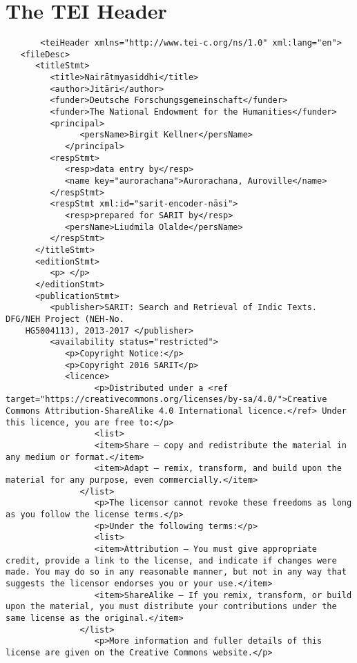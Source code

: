 \documentclass[article,12pt,a4paper]{memoir}%
\begin{document}
	 \chapter{The TEI Header}
	 \begin{verbatim}
       <teiHeader xmlns="http://www.tei-c.org/ns/1.0" xml:lang="en">
   <fileDesc>
      <titleStmt>
         <title>Nairātmyasiddhi</title>
         <author>Jitāri</author>
         <funder>Deutsche Forschungsgemeinschaft</funder>
         <funder>The National Endowment for the Humanities</funder>
         <principal>
	           <persName>Birgit Kellner</persName>
	        </principal>
         <respStmt>
            <resp>data entry by</resp>
            <name key="aurorachana">Aurorachana, Auroville</name>
         </respStmt>
         <respStmt xml:id="sarit-encoder-nāsi">
            <resp>prepared for SARIT by</resp>
            <persName>Liudmila Olalde</persName>
         </respStmt>
      </titleStmt>
      <editionStmt>
         <p> </p>
      </editionStmt>
      <publicationStmt>
         <publisher>SARIT: Search and Retrieval of Indic Texts. DFG/NEH Project (NEH-No.
	HG5004113), 2013-2017 </publisher>
         <availability status="restricted">
            <p>Copyright Notice:</p>
            <p>Copyright 2016 SARIT</p>
            <licence> 
	              <p>Distributed under a <ref target="https://creativecommons.org/licenses/by-sa/4.0/">Creative Commons Attribution-ShareAlike 4.0 International licence.</ref> Under this licence, you are free to:</p>
	              <list>
                  <item>Share — copy and redistribute the material in any medium or format.</item>
                  <item>Adapt — remix, transform, and build upon the material for any purpose, even commercially.</item>
               </list>
	              <p>The licensor cannot revoke these freedoms as long as you follow the license terms.</p>
	              <p>Under the following terms:</p>
	              <list>
                  <item>Attribution — You must give appropriate credit, provide a link to the license, and indicate if changes were made. You may do so in any reasonable manner, but not in any way that suggests the licensor endorses you or your use.</item>
                  <item>ShareAlike — If you remix, transform, or build upon the material, you must distribute your contributions under the same license as the original.</item>
               </list>
	              <p>More information and fuller details of this license are given on the Creative Commons website.</p>

\end{verbatim}
\end{document}
